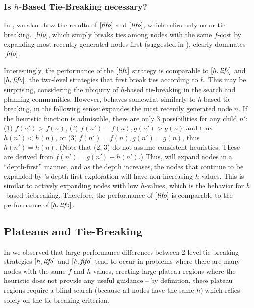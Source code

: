 \subsubsection{Is $h$-Based Tie-Breaking necessary?}
\label{sec:h-necessary}
In , we also show the results of $[\mbox{\textit{fifo}}]$ and $[\mbox{\textit{lifo}}]$,
which relies only on \fifo or \lifo tie-breaking.
$[\mbox{\textit{lifo}}]$, which simply breaks ties among nodes with the same $f$-cost by expanding most recently generated nodes first (suggested in \cite{korf1985depth}), clearly dominates $[\mbox{\textit{fifo}}]$.

Interestingly, the performance of the $[\mbox{\textit{lifo}}]$ strategy
is comparable to $[h,\mbox{\textit{lifo}}]$ and $[h,\mbox{\textit{fifo}}]$, the two-level strategies that first break ties according to $h$.
This may be surprising, considering the ubiquity of $h$-based tie-breaking in the search and planning communities.
% 
However, \lifo behaves somewhat similarly to $h$-based tie-breaking, in the following sense:
\lifo expandes the most recently generated node $n$.
If the heuristic function is admissible, there are only 3 possibilities for any child $n'$: 
(1) $f(n') > f(n)$, 
(2) $f(n') = f(n), g(n') > g(n)$ and thus $h(n') < h(n)$, or
(3) $f(n') = f(n), g(n') = g(n)$, thus $h(n') = h(n)$.
(Note that (2, 3) do not assume consistent heuristics.
These are derived from $f(n')=g(n')+h(n')$.)
Thus, \lifo will expand nodes in a ``depth-first'' manner, and as the depth increases,
the nodes that continue to be expanded by \lifo's 
depth-first exploration will have non-increasing $h$-values.
This is similar to actively expanding nodes with low $h$-values, which is the behavior for $h$-based tiebreaking.
Therefore, the performance of $[\mbox{\textit{lifo}}]$ is comparable to the performance of $[h,\mbox{\textit{lifo}}]$.


\subsection{Plateaus and Tie-Breaking}

In 
we observed that large performance differences between
2-level tie-breaking strategies $[h,\mbox{\textit{lifo}}]$ and $[h,\mbox{\textit{fifo}}]$ tend
to occur in problems where there are many nodes with the same $f$ and
$h$ values, creating large plateau regions where the heuristic does not
provide any useful guidance -- by definition, these plateau regions 
require a blind search (because all nodes
have the same $h$) which relies solely on the tie-breaking criterion.

